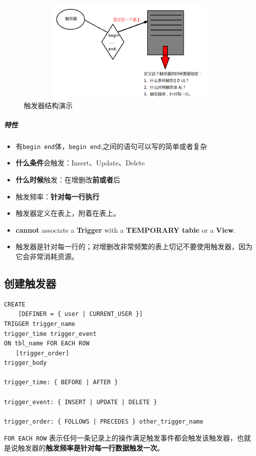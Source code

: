 \documentclass[UTF8,a4paper,12pt]{ctexbook}
\begin{document}
		\begin{figure}[H]
			\centering
			\includegraphics[width=15cm,height=5cm]{trigger}
			\caption{触发器结构演示}
		\end{figure}
		
		\subparagraph{特性}
			\begin{itemize}
				\item 有\verb|begin end|体，\verb|begin end|;之间的语句可以写的简单或者复杂
				\item \textbf{什么条件}会触发：Insert、Update、Delete
				\item \textbf{什么时候}触发：在增删改\textbf{前或者}后
				\item 触发频率：\textbf{针对每一行执行}
				\item 触发器定义在表上，附着在表上。
				\item \textbf{cannot} associate a \textbf{Trigger} with a \textbf{TEMPORARY table} or a \textbf{View}.
				\item 触发器是针对每一行的；对增删改非常频繁的表上切记不要使用触发器，因为它会非常消耗资源。 
			\end{itemize}
		
		
		\subsection{创建触发器}
			\begin{lstlisting}
CREATE
    [DEFINER = { user | CURRENT_USER }]
TRIGGER trigger_name
trigger_time trigger_event
ON tbl_name FOR EACH ROW
　　[trigger_order]
trigger_body

trigger_time: { BEFORE | AFTER }

trigger_event: { INSERT | UPDATE | DELETE }

trigger_order: { FOLLOWS | PRECEDES } other_trigger_name			
			\end{lstlisting}
		
			 \verb|FOR EACH ROW| 表示任何一条记录上的操作满足触发事件都会触发该触发器，也就是说触发器的\textbf{触发频率是针对每一行数据触发一次}。
\end{document}
